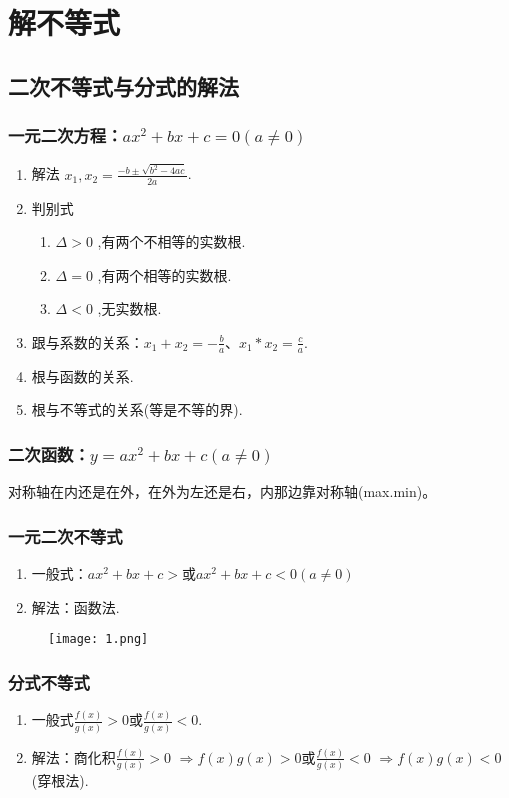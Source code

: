 \chapter{解不等式}
\section{二次不等式与分式的解法}
\subsection{一元二次方程：$ax^2+bx+c=0(a \neq 0 )$}
\begin{enumerate}
	\item 解法 $x_1,x_2=\frac{-b\pm\sqrt{b^2-4ac}}{2a}$.
	\item 判别式  
	 \begin{enumerate}
		\item $\Delta >0$ ,有两个不相等的实数根.
		\item $\Delta =0$ ,有两个相等的实数根.
		\item $\Delta <0$ ,无实数根.
	\end{enumerate}
	\item 跟与系数的关系：$x_1+x_2=-\frac{b}{a}$、$x_1*x_2=\frac{c}{a}$.
	\item 根与函数的关系.
	\item 根与不等式的关系(等是不等的界).
\end{enumerate}
\subsection{二次函数：$y=ax^2+bx+c(a \neq 0 )$}

对称轴在内还是在外，在外为左还是右，内那边靠对称轴(max.min)。
\subsection{一元二次不等式}
\begin{enumerate}
	\item 一般式：$ax^2+bx+c>$或$ax^2+bx+c<0(a\neq 0)$
	\item 解法：函数法.
\end{enumerate}
\begin{figure}[h]
\texttt{[image: 1.png]}
\end{figure}
\subsection{分式不等式}
\begin{enumerate}
	\item 一般式$\frac{f(x)}{g(x)}>0$或$\frac{f(x)}{g(x)}<0$.
	\item 解法：商化积$\frac{f(x)}{g(x)} >0$ $\Rightarrow f(x)g(x)>0$或$\frac{f(x)}{g(x)}<0$ $\Rightarrow f(x)g(x)<0$(穿根法).
\end{enumerate}
